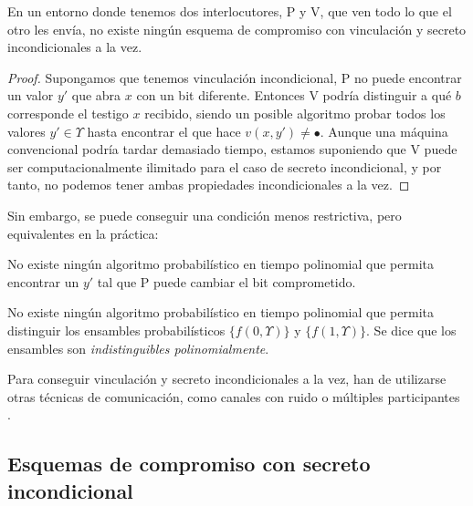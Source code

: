 \begin{proposition}
	En un entorno donde tenemos dos interlocutores, P y V, que ven todo lo que el otro les envía, no existe ningún esquema de compromiso con vinculación y secreto incondicionales a la vez.
\end{proposition}

\begin{proof}
	Supongamos que tenemos vinculación incondicional, P no puede encontrar un valor $y'$ que abra $x$ con un bit diferente. Entonces V podría distinguir a qué $b$ corresponde el testigo $x$ recibido, siendo un posible algoritmo probar todos los valores $y'\in \Upsilon$ hasta encontrar el que hace $ v(x,y') \neq \bullet$. Aunque una máquina convencional podría tardar demasiado tiempo, estamos suponiendo que V puede ser computacionalmente ilimitado para el caso de secreto incondicional, y por tanto, no podemos tener ambas propiedades incondicionales a la vez.
\end{proof}

Sin embargo, se puede conseguir una condición menos restrictiva, pero equivalentes en la práctica:

\begin{definition}
	No existe ningún algoritmo probabilístico en tiempo polinomial que permita encontrar un $y'$ tal que P puede cambiar el bit comprometido.
\end{definition}

\begin{definition}
	No existe ningún algoritmo probabilístico en tiempo polinomial que permita distinguir los ensambles probabilísticos $\{f(0,\Upsilon)\}$ y $\{f(1,\Upsilon)\}$. Se dice que los ensambles son \textit{indistinguibles polinomialmente}.
\end{definition}


Para conseguir vinculación y secreto incondicionales a la vez, han de utilizarse otras técnicas de comunicación, como canales con ruido o múltiples participantes \citep{damgardcommitment, crepeau1997efficient, ben1988completeness, chaum1988multiparty, crepeau1988achieving}.



\subsection{Esquemas de compromiso con secreto incondicional}

